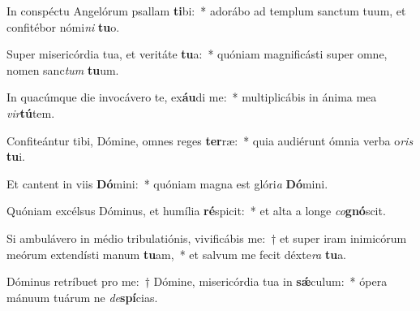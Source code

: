 \item In conspéctu Angelórum psallam \textbf{ti}bi:~* adorábo ad templum sanctum tuum, et confitébor nómi\textit{ni} \textbf{tu}o.
\item Super misericórdia tua, et veritáte \textbf{tu}a:~* quóniam magnificásti super omne, nomen sanc\textit{tum} \textbf{tu}um.
\item In quacúmque die invocávero te, ex\textbf{áu}di me:~* multiplicábis in ánima mea \textit{vir}\textbf{tú}tem.
\item Confiteántur tibi, Dómine, omnes reges \textbf{ter}ræ:~* quia audiérunt ómnia verba o\textit{ris} \textbf{tu}i.
\item Et cantent in viis \textbf{Dó}mini:~* quóniam magna est glóri\textit{a} \textbf{Dó}mini.
\item Quóniam excélsus Dóminus, et humília \textbf{ré}spicit:~* et alta a longe \textit{co}\textbf{gnó}scit.
\item Si ambulávero in médio tribulatiónis, vivificábis me:~† et super iram inimicórum meórum extendísti manum \textbf{tu}am,~* et salvum me fecit déxte\textit{ra} \textbf{tu}a.
\item Dóminus retríbuet pro me:~† Dómine, misericórdia tua in \textbf{sǽ}culum:~* ópera mánuum tuárum ne \textit{de}\textbf{spí}cias.
